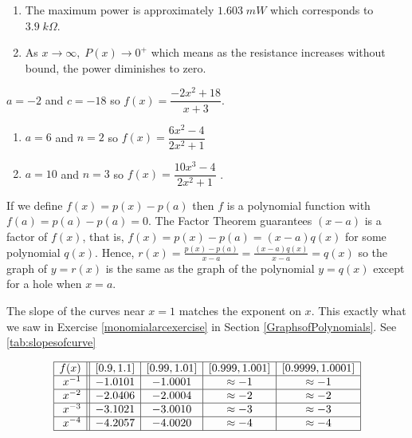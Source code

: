 \begin{exenum}
\begin{enumerate}
\item The maximum power is approximately $1.603 \; mW$ which corresponds to $3.9 \; k\Omega$.

\item As $x \rightarrow \infty, \; P(x) \rightarrow 0^{+}$ which means as the resistance increases without bound, the power diminishes to zero.

\end{enumerate}

\item  $a = -2$ and $c = -18$ so $f(x) = \dfrac{-2x^2+18}{x+3}$.

\item 

\begin{enumerate}
\item   $a=6$ and $n=2$ so $f(x) = \dfrac{6x^{2} -4}{2x^2+1}$
\item  $a=10$ and $n = 3$ so $f(x) = \dfrac{10x^{3} -4}{2x^2+1}$ .
\end{enumerate}

\item  If we define $f(x) = p(x) - p(a)$ then $f$ is a polynomial function with $f(a) = p(a) - p(a) = 0$.  The Factor Theorem guarantees $(x-a)$ is a factor of $f(x)$, that is, $f(x) = p(x) - p(a) = (x-a)q(x)$ for some polynomial $q(x)$. Hence, $r(x) = \frac{p(x)-p(a)}{x-a} = \frac{(x-a)q(x)}{x-a} = q(x)$ so the graph of $y = r(x)$ is the same as the graph of the polynomial $y = q(x)$ except for a hole when $x = a$.

\item  The slope of the curves near $x=1$ matches the exponent on $x$.  This exactly what we saw in  Exercise \ref{monomialarcexercise} in Section \ref{GraphsofPolynomials}. See \autoref{tab:slopesofcurve}

\begin{ftable}
\[ \begin{array}{|r||c|c|c|c|}  \hline

 f(x) &  [0.9, 1.1] & [0.99, 1.01] &[0.999, 1.001] & [0.9999, 1.0001]  \\ \hline
 x^{-1} & -1.0101 & -1.0001 & \approx -1 & \approx -1  \\  \hline
 x^{-2}& -2.0406& -2.0004 & \approx -2 & \approx -2   \\  \hline
 x^{-3} &-3.1021 & -3.0010 & \approx -3 & \approx -3   \\  \hline
 x^{-4} &-4.2057 & -4.0020 &\approx -4 & \approx -4   \\   \hline


\end{array} \]

\caption{}
\label{tab:slopesofcurve}
\end{ftable}

\end{exenum}